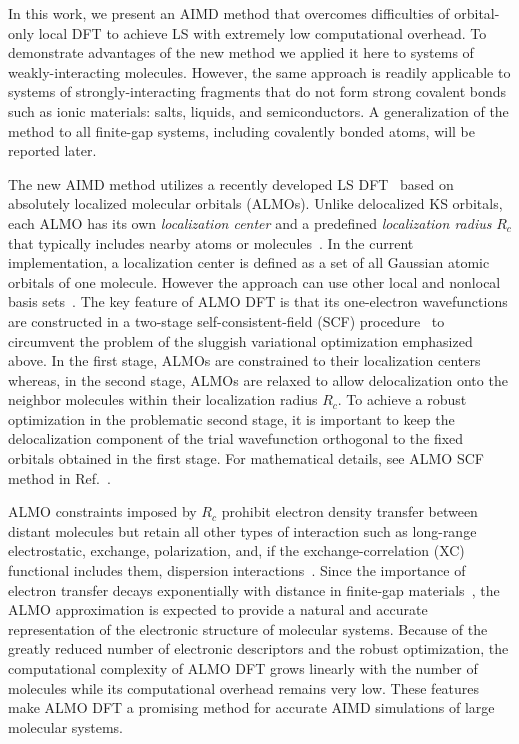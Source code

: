 \documentclass[aps,prl,reprint,amsmath,amssymb]{revtex4-1}
\begin{document}
In this work, we present an AIMD method that overcomes difficulties of orbital-only local DFT to achieve LS with extremely low computational overhead. 
To demonstrate advantages of the new method we applied it here to systems of weakly-interacting molecules. 
However, the same approach is readily applicable to systems of strongly-interacting fragments that do not form strong covalent bonds such as ionic materials: salts, liquids, and semiconductors. 
A generalization of the method to all finite-gap systems, including covalently bonded atoms, will be reported later. 

The new AIMD method utilizes a recently developed LS DFT~\cite{a:almo-ls} based on absolutely localized molecular orbitals (\mbox{ALMOs}). 
Unlike delocalized KS orbitals, each \mbox{ALMO} has its own \emph{localization center} and a predefined \emph{localization radius} $R_{c}$ that typically includes nearby atoms or molecules~\cite{a:stoll,a:almo-ls}. 
In the current implementation, a localization center is defined as a set of all Gaussian atomic orbitals of one molecule. 
However the approach can use other local and nonlocal basis sets~\cite{a:ls-galli-parrinello-1992, Lin2012}. 
The key feature of ALMO DFT is that its one-electron wavefunctions are constructed in a two-stage self-consistent-field (SCF) procedure~\cite{a:almo-ls} to circumvent the problem of the sluggish variational optimization emphasized above. 
In the first stage, ALMOs are constrained to their localization centers~\cite{a:khal} whereas, in the second stage, ALMOs are relaxed to allow delocalization onto the neighbor molecules within their localization radius $R_{c}$. 
To achieve a robust optimization in the problematic second stage, it is important to keep the delocalization component of the trial wavefunction orthogonal to the fixed orbitals obtained in the first stage. 
For mathematical details, see ALMO SCF method in Ref.~.

ALMO constraints imposed by $R_c$ prohibit electron density transfer between distant molecules but retain all other types of interaction such as long-range electrostatic, exchange, polarization, and, if the exchange-correlation (XC) functional includes them, dispersion interactions~\cite{a:theeda}. 
Since the importance of electron transfer decays exponentially with distance in finite-gap materials~\cite{a:ls-rev-1999}, the \mbox{ALMO} approximation is expected to provide a natural and accurate representation of the electronic structure of molecular systems. %
Because of the greatly reduced number of electronic descriptors and the robust optimization, the computational complexity of ALMO DFT grows linearly with the number of molecules while its computational overhead remains very low. These features make ALMO DFT a promising method for accurate AIMD simulations of large molecular systems.
\end{document}
